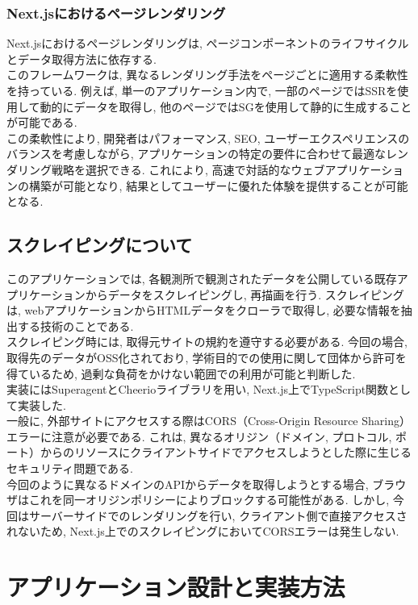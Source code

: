 \subsubsection{Next.jsにおけるページレンダリング}
Next.jsにおけるページレンダリングは, ページコンポーネントのライフサイクルとデータ取得方法に依存する. \\
このフレームワークは, 異なるレンダリング手法をページごとに適用する柔軟性を持っている. 
例えば, 単一のアプリケーション内で, 一部のページではSSRを使用して動的にデータを取得し, 他のページではSGを使用して静的に生成することが可能である. \\
この柔軟性により, 開発者はパフォーマンス, SEO, ユーザーエクスペリエンスのバランスを考慮しながら, アプリケーションの特定の要件に合わせて最適なレンダリング戦略を選択できる. 
これにより, 高速で対話的なウェブアプリケーションの構築が可能となり, 結果としてユーザーに優れた体験を提供することが可能となる. 

\subsection{スクレイピングについて}
このアプリケーションでは, 各観測所で観測されたデータを公開している既存アプリケーションからデータをスクレイピングし, 再描画を行う. 
スクレイピングは, webアプリケーションからHTMLデータをクローラで取得し, 必要な情報を抽出する技術のことである. \\
スクレイピング時には, 取得元サイトの規約を遵守する必要がある. 
今回の場合, 取得先のデータがOSS化されており, 学術目的での使用に関して団体から許可を得ているため, 過剰な負荷をかけない範囲での利用が可能と判断した. \\
実装にはSuperagentとCheerioライブラリを用い, Next.js上でTypeScript関数として実装した. \\
一般に, 外部サイトにアクセスする際はCORS（Cross-Origin Resource Sharing）エラーに注意が必要である. 
これは, 異なるオリジン（ドメイン, プロトコル, ポート）からのリソースにクライアントサイドでアクセスしようとした際に生じるセキュリティ問題である.\cite{no8} \\
今回のように異なるドメインのAPIからデータを取得しようとする場合, ブラウザはこれを同一オリジンポリシーによりブロックする可能性がある. 
しかし, 今回はサーバーサイドでのレンダリングを行い, クライアント側で直接アクセスされないため, Next.js上でのスクレイピングにおいてCORSエラーは発生しない. 

\section{アプリケーション設計と実装方法}
